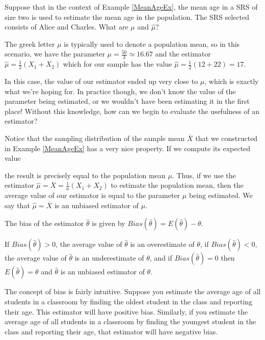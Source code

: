 \begin{examp}Suppose that in the context of Example \ref{MeanAgeEx}, the mean age in a SRS of size two is used to estimate the mean age in the population. The SRS selected consists of Alice and Charles. What are $\mu$ and $\widehat{\mu}$?
\par
\noindent The greek letter $\mu$ is typically used to denote a population mean, so in this scenario, we have the parameter $\mu = \frac{50}{3} \simeq 16.67$ and the estimator $\widehat{\mu} = \frac{1}{2}(X_1+X_2)$ which for our sample has the value $\widehat{\mu} = \frac{1}{2}(12+22) = 17$.
\end{examp}
\par
In this case, the value of our estimator ended up very close to $\mu$, which is exactly what we're hoping for. In practice though, we don't know the value of the parameter being estimated, or we wouldn't have been estimating it in the first place! Without this knowledge, how can we begin to evaluate the usefulness of an estimator?
\par
Notice that the sampling distribution of the sample mean $\overline{X}$ that we constructed in Example \ref{MeanAgeEx} has a very nice property. If we compute its expected value 
\par
\noindent the result is precisely equal to the population mean $\mu$. Thus, if we use the estimator $\widehat\mu = \overline{X} = \frac{1}{n}(X_1+X_2)$ to estimate the population mean, then the average value of our estimator is equal to the parameter $\mu$ being estimated. We say that $\widehat\mu = \overline{X}$ is an unbiased estimator of $\mu$.

\begin{defn}\label{Unbiased Estimator} The bias of the estimator $\widehat{\theta}$ is given by $Bias(\widehat{\theta}) = E(\widehat{\theta}) - \theta$. 
\end{defn}
\par
If $Bias(\widehat{\theta}) > 0$, the average value of $\widehat{\theta}$ is an overestimate of $\theta$, if $Bias(\widehat{\theta}) < 0$, the average value of $\widehat{\theta}$ is an underestimate of $\theta$, and if $Bias(\widehat{\theta}) = 0$ then $E(\widehat{\theta}) = \theta$ and $\widehat{\theta}$ is an unbiased estimator of $\theta$.
\par
The concept of bias is fairly intuitive. Suppose you estimate the average age of all students in a classroom by finding the oldest student in the class and reporting their age. This estimator will have positive bias. Similarly, if you estimate the average age of all students in a classroom by finding the youngest student in the class and reporting their age, that estimator will have negative bias.


